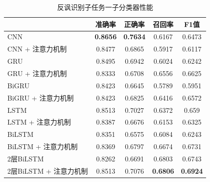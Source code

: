 \begin{table}[htb]
  \centering
  \begin{minipage}[t]{0.8\linewidth}
  \caption{反讽识别子任务一子分类器性能}
  \label{tab:exp_irony_det_Bb02_result}
    \begin{tabularx}{\linewidth}{X|cccc}
    \toprule[1.5pt]
    & 准确率 & 正确率 & 召回率 & F1值 \\
    \hline
    CNN & \bf 0.8656 & \bf 0.7634 & 0.6167 & 0.6473 \\ %
    CNN + 注意力机制 & 0.8477 & 0.6865 & 0.5917 & 0.6117 \\ %
    \hline
    GRU & 0.8495 & 0.6942 & 0.6024 & 0.6242 \\ %
    GRU + 注意力机制 & 0.8333 & 0.6708 & 0.6556 & 0.6625 \\ %
    \hline
    BiGRU & 0.8423 & 0.6645 & 0.5789 & 0.5951 \\ %
    BiGRU + 注意力机制 & 0.8423 & 0.6825 & 0.6416 & 0.6572 \\ %
    \hline
    LSTM & 0.8513 & 0.7027 & 0.6372 & 0.659 \\ %
    LSTM + 注意力机制 & 0.8387 & 0.6676 & 0.6153 & 0.6325 \\ %
    \hline
    BiLSTM & 0.8351 & 0.6575 & 0.6084 & 0.6243 \\ %
    BiLSTM + 注意力机制 & 0.8369 & 0.6797 & 0.6674 & 0.6731 \\ %
    \hline
    2层BiLSTM & 0.8262 & 0.6691 & 0.6803 & 0.6743 \\ %
    2层BiLSTM + 注意力机制 & 0.8513 & 0.7076 & \bf 0.6806 & \bf 0.6924 \\ %
    \bottomrule[1.5pt]
    \end{tabularx}
  \end{minipage}
\end{table}

